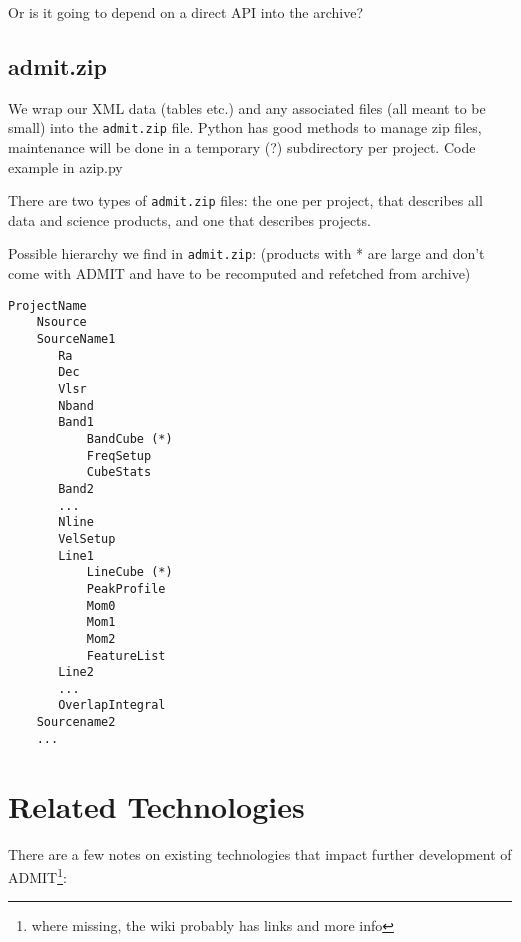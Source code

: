 \documentclass[preprint]{aastex} %
\begin{document}
Or is it going to depend on a direct API into the archive?  


\subsection{admit.zip}

We wrap our XML data (tables etc.) and any associated files (all meant to be small)
into the {\tt admit.zip} file.
Python has good methods to manage zip files, maintenance will be done in 
a temporary (?) subdirectory per project. Code example in azip.py

There are two types of {\tt admit.zip} files: the one per project, that describes
all data and science products, and one that describes projects.

Possible hierarchy we find in {\tt admit.zip}: (products with * are large and don't come
with ADMIT and have to be recomputed and refetched from archive)
\footnotesize
\begin{verbatim}
ProjectName
    Nsource
    SourceName1
       Ra
       Dec
       Vlsr
       Nband
       Band1
           BandCube (*)
           FreqSetup
           CubeStats
       Band2
       ...
       Nline
       VelSetup
       Line1
           LineCube (*)
           PeakProfile
           Mom0
           Mom1
           Mom2
           FeatureList
       Line2
       ...
       OverlapIntegral
    Sourcename2
    ...    
\end{verbatim}
\normalsize


\section{Related Technologies}

There are a few notes on existing technologies that 
impact further development of ADMIT\footnote{where missing, the wiki probably has 
links and more info}:
\end{document}
